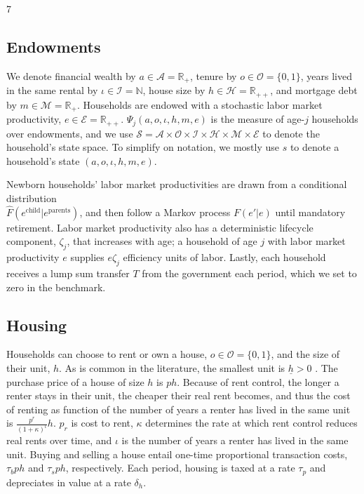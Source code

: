 7\documentclass[parskip=full]{article}
\begin{document}
\subsection{Endowments}

We denote financial wealth by $a\in \mathcal{A}=\mathbb{R}_+$, tenure by $o \in \mathcal{O}=\{0,1\}$, years lived in the same rental by $\iota \in \mathcal{I}=\mathbb{N}$, house size by $h\in \mathcal{H}=\mathbb{R}_{++}$, and mortgage debt by $m\in \mathcal{M}=\mathbb{R}_+$. Households are endowed with a stochastic labor market productivity, $e \in\mathcal{E} = \mathbb{R}_{++}$. $\Psi_{j}(a,o,\iota,h,m,e)$ is the measure of age-$j$ households over endowments, and we use $\mathcal{S}=\mathcal{A}\times\mathcal{O}\times\mathcal{I}\times\mathcal{H}\times\mathcal{M}\times\mathcal{E}$ to denote the household's state space. To simplify on notation, we mostly use $s$ to denote a household's state $(a,o,\iota,h,m,e)$.

Newborn households' labor market productivities are drawn from a conditional distribution \\ $\hat{F}(e^{\mbox{child}}|e^{\mbox{parents}})$, and then follow a Markov process $F(e'|e)$ until mandatory retirement. Labor market productivity also has a deterministic lifecycle component, $\zeta_j$, that increases with age; a household of age $j$ with labor market productivity $e$ supplies $e\zeta_j$ efficiency units of labor. Lastly, each household receives a lump sum transfer $T$ from the government each period, which we set to zero in the benchmark.

\subsection{Housing}\label{subsection:housing_choice}

Households can choose to rent or own a house, $o \in \mathcal{O}=\{0,1\}$, and the size of their unit, $h$. As is common in the literature, the smallest unit is $\underline{h}>0$ \citep{gervais,sommeretal-2013,sommersullivan-2017,kaplanetal-2019}. The purchase price of a house of size $h$ is $p h$. Because of rent control, the longer a renter stays in their unit, the cheaper their real rent becomes, and thus the cost of renting as function of the number of years a renter has lived in the same unit is $\frac{p^{r}}{(1+\kappa)^{\iota}} h$. $p_{r}$ is cost to rent, $\kappa$ determines the rate at which rent control reduces real rents over time, and $\iota$ is the number of years a renter has lived in the same unit. Buying and selling a house entail one-time proportional transaction costs, $\tau_{b} p h$ and $\tau_{s} p h$, respectively. Each period, housing is taxed at a rate $\tau_{p}$ and depreciates in value at a rate $\delta_h$. 
\end{document}
